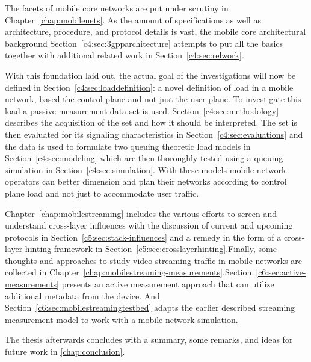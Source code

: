 The facets of mobile core networks are put under scrutiny in Chapter~\ref{chap:mobilenets}. As the amount of specifications as well as architecture, procedure, and protocol details is vast, the mobile core architectural background Section~\ref{c4:sec:3gpparchitecture} attempts to put all the basics together with additional related work in Section~\ref{c4:sec:relwork}.

With this foundation laid out, the actual goal of the investigations will now be defined in Section~\ref{c4:sec:loaddefinition}: a novel definition of load in a mobile network, based the control plane and not just the user plane. To investigate this load a passive measurement data set is used. Section~\ref{c4:sec:methodology} describes the acquisition of the set and how it should be interpreted. The set is then evaluated for its signaling characteristics in Section~\ref{c4:sec:evaluations} and the data is used to formulate two queuing theoretic load models in Section~\ref{c4:sec:modeling} which are then thoroughly  tested using a queuing simulation in Section~\ref{c4:sec:simulation}. With these models mobile network operators can better dimension and plan their networks according to control plane load and not just to accommodate user traffic.


Chapter~\ref{chap:mobilestreaming} includes the various efforts to screen and understand cross-layer influences with the discussion of current and upcoming protocols in Section~\ref{c5:sec:stack-influences} and a remedy in the form of a cross-layer hinting framework in Section~\ref{c5:sec:crosslayerhinting}.Finally, some thoughts and approaches to study video streaming traffic in mobile networks are collected in Chapter~\ref{chap:mobilestreaming-measurements}.Section~\ref{c6:sec:active-measurements} presents an active measurement approach that can utilize additional metadata from the device. And Section~\ref{c6:sec:mobilestreamingtestbed} adapts the earlier described streaming measurement model to work with a mobile network simulation.

The thesis afterwards concludes with a summary, some remarks, and ideas for future work in \ref{chap:conclusion}.






